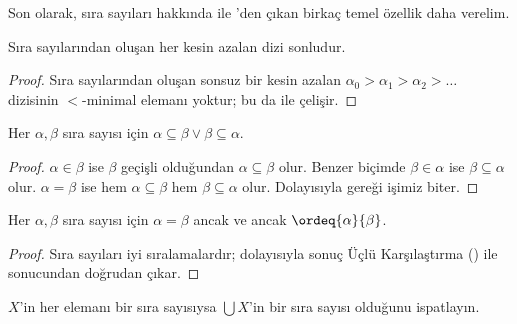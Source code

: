 \documentclass[../../../include/open-logic-section]{subfiles}
\begin{document}
Son olarak, sıra sayıları hakkında  ile
'den çıkan birkaç temel özellik daha verelim.

\begin{prop}
Sıra sayılarından oluşan her kesin azalan dizi sonludur.
\end{prop}

\begin{proof}
Sıra sayılarından oluşan sonsuz bir kesin azalan
$\alpha_0>\alpha_1>\alpha_2>\ldots$ dizisinin $<$-minimal elemanı yoktur;
bu da  ile çelişir.
\end{proof}

\begin{prop}
Her $\alpha,\beta$ sıra sayısı için
$\alpha\subseteq\beta\lor\beta\subseteq\alpha$.
\end{prop}

\begin{proof}
$\alpha\in\beta$ ise $\beta$ geçişli olduğundan
$\alpha\subseteq\beta$ olur. Benzer biçimde $\beta\in\alpha$ ise
$\beta\subseteq\alpha$ olur. $\alpha=\beta$ ise hem
$\alpha\subseteq\beta$ hem $\beta\subseteq\alpha$ olur. Dolayısıyla
 gereği işimiz biter.
\end{proof}

\begin{prop}
Her $\alpha,\beta$ sıra sayısı için $\alpha=\beta$ ancak ve ancak
$\ordeq{\alpha}{\beta}$.
\end{prop}

\begin{proof}
Sıra sayıları iyi sıralamalardır; dolayısıyla sonuç Üçlü Karşılaştırma
() ile
 sonucundan doğrudan çıkar.
\end{proof}

\begin{prob}
$X$'in her elemanı bir sıra sayısıysa $\bigcup X$'in bir sıra sayısı
olduğunu ispatlayın.
\end{prob}
\end{document}
